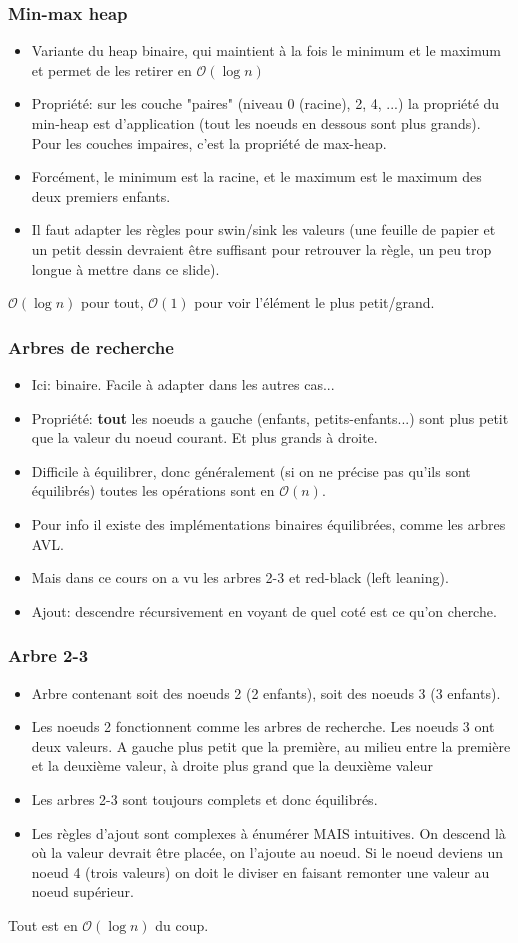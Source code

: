 \documentclass[8pt,aspectratio=169]{beamer}
\begin{document}
\begin{frame}
\frametitle{Min-max heap}
\begin{itemize}
	\item Variante du heap binaire, qui maintient à la fois le minimum et le maximum et permet de les retirer en $\mathcal{O}(\log n)$
	\item Propriété: sur les couche "paires" (niveau 0 (racine), 2, 4, ...) la propriété du min-heap est d'application (tout les noeuds en dessous sont plus grands). Pour les couches impaires, c'est la propriété de max-heap.
	\item Forcément, le minimum est la racine, et le maximum est le maximum des deux premiers enfants.
	\item Il faut adapter les règles pour swin/sink les valeurs (une feuille de papier et un petit dessin devraient être suffisant pour retrouver la règle, un peu trop longue à mettre dans ce slide).
\end{itemize}
$\mathcal{O}(\log n)$ pour tout, $\mathcal{O}(1)$ pour voir l'élément le plus petit/grand.
\end{frame}
\begin{frame}
\frametitle{Arbres de recherche}
\begin{itemize}
	\item Ici: binaire. Facile à adapter dans les autres cas...
	\item Propriété: \textbf{tout} les noeuds a gauche (enfants, petits-enfants...) sont plus petit que la valeur du noeud courant. Et plus grands à droite.
	\item Difficile à équilibrer, donc généralement (si on ne précise pas qu'ils sont équilibrés) toutes les opérations sont en $\mathcal{O}(n)$.
	\item Pour info il existe des implémentations binaires équilibrées, comme les arbres AVL.
	\item Mais dans ce cours on a vu les arbres 2-3 et red-black (left leaning).
	\item Ajout: descendre récursivement en voyant de quel coté est ce qu'on cherche.
\end{itemize}
\end{frame}

\begin{frame}
\frametitle{Arbre 2-3}
\begin{itemize}
	\item Arbre contenant soit des noeuds 2 (2 enfants), soit des noeuds 3 (3 enfants).
	\item Les noeuds 2 fonctionnent comme les arbres de recherche. Les noeuds 3 ont deux valeurs. A gauche plus petit que la première, au milieu entre la première et la deuxième valeur, à droite plus grand que la deuxième valeur
	\item Les arbres 2-3 sont toujours complets et donc équilibrés.
	\item Les règles d'ajout sont complexes à énumérer MAIS intuitives. On descend là où la valeur devrait être placée, on l'ajoute au noeud. Si le noeud deviens un noeud 4 (trois valeurs) on doit le diviser en faisant remonter une valeur au noeud supérieur.
\end{itemize}
Tout est en $\mathcal{O}(\log n)$ du coup.
\end{frame}
\end{document}
